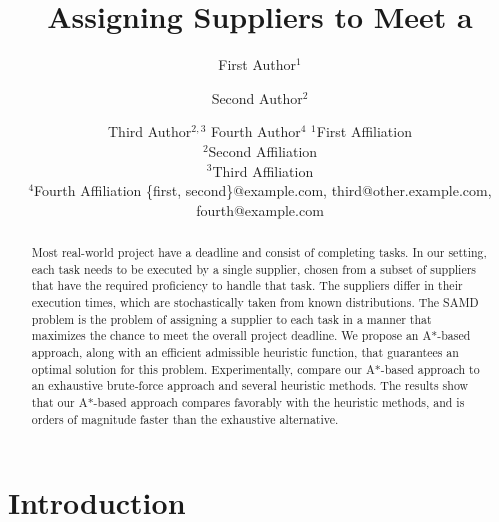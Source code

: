 \documentclass[letterpaper]{article} %
\title{Assigning Suppliers to Meet a }
\author{
}
\author{
First Author$^1$
\and
Second Author$^2$\and
Third Author$^{2,3}$\And
Fourth Author$^4$
\affiliations
$^1$First Affiliation\\
$^2$Second Affiliation\\
$^3$Third Affiliation\\
$^4$Fourth Affiliation
\emails
\{first, second\}@example.com,
third@other.example.com,
fourth@example.com
}
\newcommand{\samd}{\ac{SAMD}\xspace}
\newcommand{\astar}{\textsc{A*}\xspace}
\begin{document}
\maketitle

\begin{abstract}
Most real-world project have a deadline and consist of completing tasks.
In our setting, each task needs to be executed by a single supplier, chosen from a subset of suppliers that have the required proficiency to handle that task. The suppliers differ in their execution times, which are stochastically taken from known distributions. The \samd problem is the problem of assigning a supplier to each task in a manner that maximizes the chance to meet the overall project deadline.
We propose an \astar-based approach, along with an efficient admissible heuristic function,   that guarantees an optimal solution for this problem. Experimentally,  compare our A*-based approach to an exhaustive brute-force approach and several heuristic methods. The results show that our A*-based approach compares favorably with the heuristic methods, and is orders of magnitude faster than the exhaustive alternative.
\end{abstract}

\section{Introduction}
\end{document}
